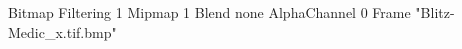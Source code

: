 {Bitmap
	{Filtering 1}
	{Mipmap 1}
	{Blend none}
	{AlphaChannel 0}
	{Frame "Blitz-Medic_x.tif.bmp"}
}
